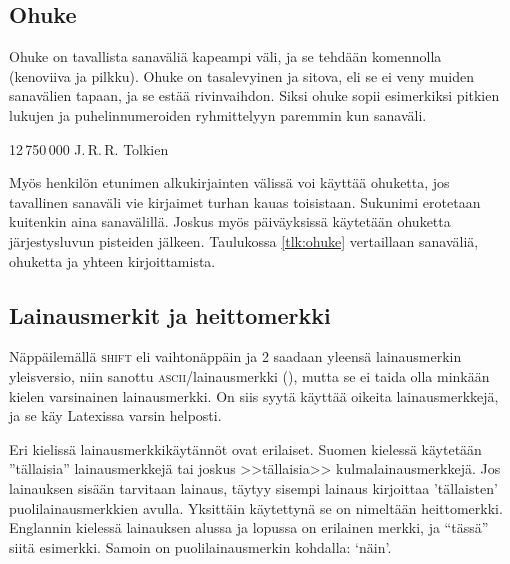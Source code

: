 \subsection{Ohuke}

Ohuke on tavallista sanaväliä kapeampi väli, ja se tehdään
komennolla~\koodi{\keno,} (kenoviiva ja pilkku). Ohuke on tasalevyinen
ja sitova, eli se ei veny muiden sanavälien tapaan, ja se estää
rivinvaihdon. Siksi ohuke sopii esimerkiksi pitkien lukujen ja
puhelinnumeroiden ryhmittelyyn paremmin kun sanaväli.

\begin{koodilohkosis}
  12\,750\,000
  J.\,R.\,R. Tolkien
\end{koodilohkosis}

Myös henkilön etunimen alkukirjainten välissä voi käyttää ohuketta, jos
tavallinen sanaväli vie kirjaimet turhan kauas toisistaan. Sukunimi
erotetaan kuitenkin aina sanavälillä. Joskus myös päiväyksissä käytetään
ohuketta järjestysluvun pisteiden jälkeen. Taulukossa \ref{tlk:ohuke}
vertaillaan sanaväliä, ohuketta ja yhteen kirjoittamista.


\subsection{Lainausmerkit ja heittomerkki}

Näppäilemällä \textsc{shift} eli vaihtonäppäin ja 2 saadaan yleensä
lainausmerkin yleisversio, niin sanottu \textsc{ascii}\-/lainausmerkki
(\textquotedbl), mutta se ei taida olla minkään kielen varsinainen
lainausmerkki. On siis syytä käyttää oikeita lainausmerkkejä, ja se käy
Latexissa varsin helposti.

Eri kielissä lainausmerkkikäytännöt ovat erilaiset. Suomen kielessä
käytetään ''tällaisia'' lainausmerkkejä tai joskus >>tällaisia>>
kulmalainausmerkkejä. Jos lainauksen sisään tarvitaan lainaus, täytyy
sisempi lainaus kirjoittaa 'tällaisten' puolilainausmerkkien avulla.
Yksittäin käytettynä se on nimeltään heittomerkki. Englannin kielessä
lainauksen alussa ja lopussa on erilainen merkki, ja ``tässä'' siitä
esimerkki. Samoin on puolilainausmerkin kohdalla: `näin'.

